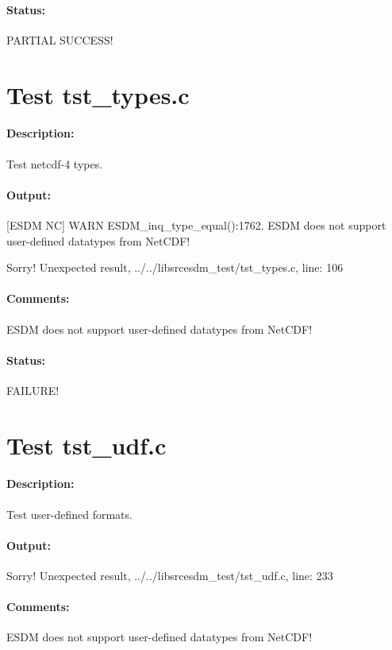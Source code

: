\paragraph{Status:} PARTIAL SUCCESS!

\section{Test tst\_types.c}

\paragraph{Description:} Test netcdf-4 types.

\paragraph{Output:} [ESDM NC] WARN ESDM\_inq\_type\_equal():1762. ESDM does not support user-defined datatypes from NetCDF!

Sorry! Unexpected result, ../../libsrcesdm\_test/tst\_types.c, line: 106

\paragraph{Comments:} ESDM does not support user-defined datatypes from NetCDF!

\paragraph{Status:} FAILURE!

\section{Test tst\_udf.c}

\paragraph{Description:} Test user-defined formats.

\paragraph{Output:} Sorry! Unexpected result, ../../libsrcesdm\_test/tst\_udf.c, line: 233

\paragraph{Comments:} ESDM does not support user-defined datatypes from NetCDF!

